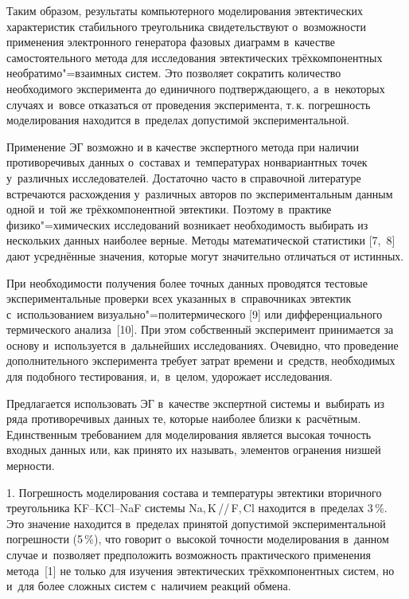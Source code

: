 Таким образом, результаты компьютерного моделирования эвтектических 
характеристик стабильного треугольника свидетельствуют о~возможности 
применения электронного генератора фазовых диаграмм в~качестве 
самостоятельного метода для исследования эвтектических трёхкомпонентных 
не\-об\-ратимо"=взаимных систем. Это позволяет сократить количество необходимого 
эксперимента до единичного подтверждающего, а~в~некоторых случаях и~вовсе 
отказаться от проведения эксперимента, т.\,к. погрешность моделирования 
находится в~пределах допустимой экспериментальной. 

Применение ЭГ возможно и в качестве экспертного метода при наличии 
противоречивых данных о~составах и~температурах нонвариантных точек 
у~различных исследователей. Достаточно часто в справочной литературе 
встречаются расхождения у~различных авторов по экспериментальным данным 
одной и~той же трёхкомпонентной эвтектики. Поэтому в~практике 
физико"=химических исследований возникает необходимость выбирать из 
нескольких данных наиболее верные. Методы математической статистики [7,~8] 
дают усреднённые значения, которые могут значительно отличаться от 
истинных.

При необходимости получения более точных данных проводятся тестовые 
экспериментальные проверки всех указанных в~справочниках эвтектик 
с~использованием визуально"=политермического [9] или дифференциального 
термического анализа~[10]. При этом собственный эксперимент принимается за 
основу и~используется в~дальнейших исследованиях. Очевидно, что проведение 
дополнительного эксперимента требует затрат времени и~средств, необходимых 
для подобного тестирования, и,~в~целом, удорожает исследования. 

Предлагается использовать ЭГ в~качестве экспертной системы и~выбирать из 
ряда противоречивых данных те, которые наиболее близки к~расчётным. 
Единственным требованием для моделирования является высокая точность входных 
данных или, как принято их называть, элементов огранения низшей мерности.

\smallskip
{}


1. Погрешность моделирования состава и температуры эвтектики вторичного 
треугольника KF--KCl--NaF системы Na,\,K\,/\!/\,F,\,Cl находится в~пределах 3\,{\%}. 
Это значение находится в~пределах принятой допустимой экспериментальной 
погрешности (5\,{\%}), что говорит о~высокой точности моделирования в~данном 
случае и~позволяет предположить возможность практического применения метода~[1] 
не только для изучения эвтектических трёхкомпонентных систем, но и~для 
более сложных систем с~наличием реакций обмена.


